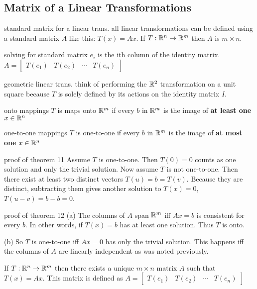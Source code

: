 \begin{card}
    \subsection{Matrix of a Linear Transformations}

    \begin{compactdesc}
    \item[standard matrix for a linear trans.] all linear transformations
        can be defined using a standard matrix $A$ like this: $T(x) = Ax$.
        If $T: \mathbb{R}^n \to \mathbb{R}^m$ then $A$ is $m \times n$.
    \item[solving for standard matrix] $e_i$ is the ith column of the identity
    matrix. $A = \begin{bmatrix}T(e_1) & T(e_2) & \cdots & T(e_n) \end{bmatrix}$
    \item[geometric linear trans.] think of performing the $\mathbb{R}^2$ transformation
        on a unit square because $T$ is solely defined by its actions on the
        identity matrix $I$.
    \item[onto mappings] $T$ is maps onto $\mathbb{R}^m$ if every $b$ in $\mathbb{R}^m$ is
        the image of \textbf{at least one} $x \in \mathbb{R}^n$
    \item[one-to-one mappings] $T$ is one-to-one if every $b$ in $\mathbb{R}^m$ is
        the image of \textbf{at most one} $x \in \mathbb{R}^n$
    \item[proof of theorem 11]
        Assume $T$ is one-to-one. Then $T(0) = 0$ counts as one solution
        and only the trivial solution. Now assume $T$ is not one-to-one. Then
        there exist at least two distinct vectors $T(u) = b = T(v)$.
        Because they are distinct, subtracting them gives another solution to $T(x) = 0$,
        $T(u - v) = b - b = 0$.
    \item[proof of theorem 12]
        (a) The columns of $A$ span $\mathbb{R}^m$ iff $Ax = b$ is consistent for
        every $b$. In other words, if $T(x) = b$ has at least one
        solution. Thus $T$ is onto.

        (b) So $T$ is one-to-one iff $Ax = 0$ has only the trivial solution.
        This happens iff the columns of $A$ are linearly independent as
        was noted previously.
    \end{compactdesc}


    \begin{theorem}
        If $T: \mathbb{R}^n \to \mathbb{R}^m$ then there exists a unique $m\times n$
        matrix $A$ such that $T(x) = Ax$. This matrix is defined as
        $A = \begin{bmatrix}T(e_1) & T(e_2) & \cdots & T(e_n) \end{bmatrix}$
    \end{theorem}


\end{card}
